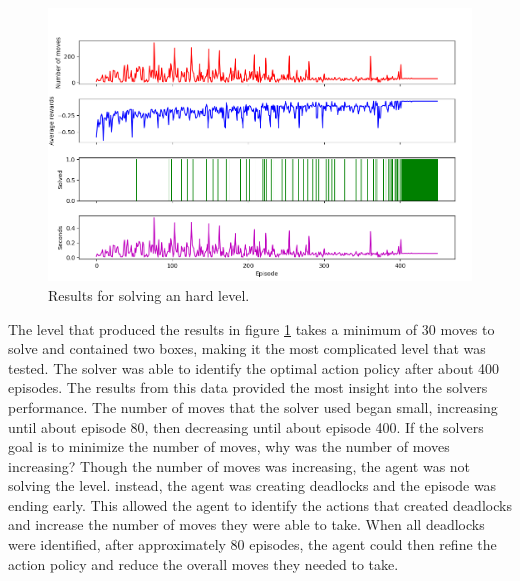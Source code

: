 \documentclass[times, 10pt,twocolumn]{article}
\begin{document}
\begin{figure}[h] 
  \centering
     \includegraphics[width=\linewidth]{images/hard_graph.png}
  \caption{Results for solving an hard level.}
  \label{fig:h}
\end{figure}

The level that produced the results in figure \ref{fig:h} takes a minimum of 30 moves to solve and contained two boxes, making it the most complicated level that was tested. The solver was able to identify the optimal action policy after about 400 episodes. The results from this data provided the most insight into the solvers performance. The number of moves that the solver used began small, increasing until about episode 80, then decreasing until about episode 400. If the solvers goal is to minimize the number of moves, why was the number of moves increasing? Though the number of moves was increasing, the agent was not solving the level. instead, the agent was creating deadlocks and the episode was ending early. This allowed the agent to identify the actions that created deadlocks and increase the number of moves they were able to take. When all deadlocks were identified, after approximately 80 episodes, the agent could then refine the action policy and reduce the overall moves they needed to take.





\end{document}
